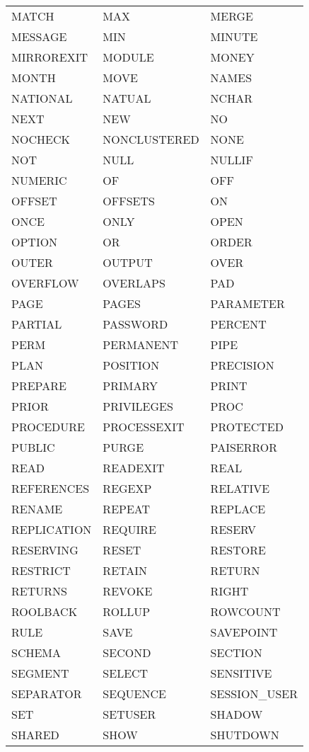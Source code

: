\begin{longtable}{m{120pt}m{120pt}m{120pt}}
MATCH						&MAX				&MERGE\\
MESSAGE					&MIN				&MINUTE\\
MIRROREXIT					&MODULE			&MONEY\\
MONTH						&MOVE				&NAMES\\
NATIONAL					&NATUAL			&NCHAR\\
NEXT						&NEW				&NO\\
NOCHECK					&NONCLUSTERED	&NONE\\
NOT						&NULL				&NULLIF\\
NUMERIC					&OF				&	OFF\\
OFFSET						&OFFSETS			&ON\\
ONCE						&ONLY				&OPEN\\
OPTION						&OR				&	ORDER\\
OUTER						&OUTPUT			&OVER\\
OVERFLOW					&OVERLAPS		&	PAD\\
PAGE						&PAGES			&	PARAMETER\\
PARTIAL					&PASSWORD		&	PERCENT\\
PERM						&PERMANENT		&PIPE\\
PLAN						&POSITION			&PRECISION\\
PREPARE					&PRIMARY			&PRINT\\
PRIOR						&PRIVILEGES		&	PROC\\
PROCEDURE				&PROCESSEXIT		&PROTECTED\\
PUBLIC						&PURGE			&	PAISERROR\\
READ						&READEXIT			&REAL\\
REFERENCES				&REGEXP			&RELATIVE\\
RENAME					&REPEAT			&	REPLACE\\
REPLICATION				&REQUIRE			&RESERV\\
RESERVING					&RESET				&RESTORE\\
RESTRICT					&RETAIN			&	RETURN\\
RETURNS					&REVOKE			&RIGHT\\
ROOLBACK					&ROLLUP			&ROWCOUNT\\
RULE						&SAVE				&SAVEPOINT\\
SCHEMA					&SECOND			&SECTION\\
SEGMENT					&SELECT			&	SENSITIVE\\
SEPARATOR					&SEQUENCE		&	SESSION\_USER\\
SET							&SETUSER			&SHADOW\\
SHARED					&SHOW			&	SHUTDOWN\\

\end{longtable}
